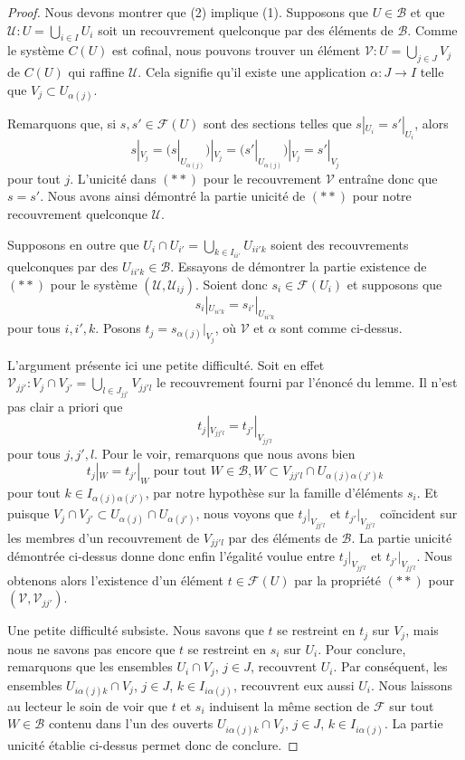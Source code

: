 \begin{proof}
Nous devons montrer que (2) implique (1).
Supposons que $U \in \mathcal{B}$ et que
$\mathcal{U} : U = \bigcup_{i\in I} U_i$ soit un recouvrement quelconque
par des éléments de $\mathcal{B}$. Comme le système $C(U)$ est cofinal,
nous pouvons trouver un élément $\mathcal{V} : U = \bigcup_{j \in J} V_j$
de $C(U)$ qui raffine $\mathcal{U}$. Cela signifie qu'il existe
une application $\alpha : J \to I$ telle que $V_j \subset U_{\alpha(j)}$.

\medskip\noindent
Remarquons que, si $s, s' \in \mathcal{F}(U)$ sont des sections telles
que $s|_{U_i} = s'|_{U_i}$, alors
$$
s|_{V_j}
= (s|_{U_{\alpha(j)}})|_{V_j}
= (s'|_{U_{\alpha(j)}})|_{V_j}
= s'|_{V_j}
$$
pour tout $j$. L'unicité dans $(**)$
pour le recouvrement $\mathcal{V}$ entraîne donc que $s = s'$.
Nous avons ainsi démontré la partie unicité de $(**)$
pour notre recouvrement quelconque $\mathcal{U}$.

\medskip\noindent
Supposons en outre que $U_i \cap U_{i'} = \bigcup_{k \in I_{ii'}} U_{ii'k}$
soient des recouvrements quelconques par des $U_{ii'k} \in \mathcal{B}$.
Essayons de démontrer la partie existence de $(**)$ pour le système
$(\mathcal{U}, \mathcal{U}_{ij})$. Soient donc $s_i \in \mathcal{F}(U_i)$
et supposons que
$$
s_i|_{U_{ii'k}} = s_{i'}|_{U_{ii'k}}
$$
pour tous $i, i', k$. Posons $t_j = s_{\alpha(j)}|_{V_j}$, où $\mathcal{V}$
et $\alpha$ sont comme ci-dessus.

\medskip\noindent
L'argument présente ici une petite difficulté. Soit en effet
$\mathcal{V}_{jj'} : V_j \cap V_{j'} = \bigcup_{l \in J_{jj'}} V_{jj'l}$
le recouvrement fourni par l'énoncé du lemme.
Il n'est pas clair a priori que
$$
t_j|_{V_{jj'l}} = t_{j'}|_{V_{jj'l}}
$$
pour tous $j, j', l$. Pour le voir, remarquons que nous avons bien
$$
t_j|_W = t_{j'}|_W \text{ pour tout } W \in \mathcal{B},
W \subset V_{jj'l} \cap U_{\alpha(j)\alpha(j')k}
$$
pour tout $k \in I_{\alpha(j)\alpha(j')}$, par notre hypothèse sur
la famille d'éléments $s_i$. Et puisque
$V_j \cap V_{j'} \subset U_{\alpha(j)} \cap U_{\alpha(j')}$,
nous voyons que $t_j|_{V_{jj'l}}$ et $t_{j'}|_{V_{jj'l}}$
coïncident sur les membres d'un recouvrement de $V_{jj'l}$ par des
éléments de $\mathcal{B}$. La partie unicité démontrée ci-dessus
donne donc enfin l'égalité voulue entre
$t_j|_{V_{jj'l}}$ et $t_{j'}|_{V_{jj'l}}$.
Nous obtenons alors l'existence d'un élément $t \in \mathcal{F}(U)$
par la propriété $(**)$ pour $(\mathcal{V}, \mathcal{V}_{jj'})$.

\medskip\noindent
Une petite difficulté subsiste. Nous savons que $t$ se restreint en $t_j$ sur $V_j$,
mais nous ne savons pas encore que $t$ se restreint en $s_i$ sur $U_i$. Pour conclure,
remarquons que les ensembles $U_i \cap V_j$, $j \in J$, recouvrent $U_i$. Par conséquent,
les ensembles $U_{i \alpha(j) k} \cap V_j$, $j\in J$, $k \in I_{i\alpha(j)}$,
recouvrent eux aussi $U_i$. Nous laissons au lecteur le soin de voir que $t$ et $s_i$ induisent
la même section de $\mathcal{F}$ sur tout $W \in \mathcal{B}$
contenu dans l'un des ouverts
$U_{i \alpha(j) k} \cap V_j$, $j\in J$, $k \in I_{i\alpha(j)}$.
La partie unicité établie ci-dessus permet donc de conclure.
\end{proof}

